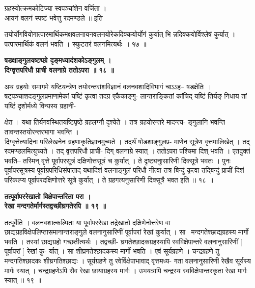 \documentclass[11pt, openany]{book}
\begin{document}
{{{{\vspace{2mm}
\centering
 ग्रहस्योत्क्रमकोटिज्या स्वपञ्चांशेन वर्जिता ।\\
 आयनं वलनं स्पष्टं भवेत्तु रदमण्डले ॥ इति
 
 \vspace{2mm}
 \justifying
 तयोर्योगवियोगात्पारमार्थिकमक्षवलनायनवलनयोरेकदिक्कयोर्योगं कुर्यात् भि
न्नदिक्कयोर्विश्लेषं कुर्यात् । पत्पारमार्थिकं वलनं भवति । स्फुटतरं
वलनमित्यर्थः ॥ १७ ॥

\vspace{2mm}
\centering
\textbf{
\hspace{-1.2cm}
 षडक्षाङ्गुलयष्ट्यग्रे दृङ्मध्यादंशकोऽङ्गुलम् ।\\
 दिग्वृत्तपरिधौ प्राची वलनाग्रे ततोऽपरा ॥ १८ ॥}

\vspace{2mm}
\justifying
 अथ ग्रहयोः समागमे यष्टियन्त्रेण तयोरन्तरांशविज्ञानं वलनवशादिविभागं
चाऽऽह-- षडक्षेति । षट्पञ्चाशदङ्गुलप्रमाणामेकां यष्टिं कृत्वा
तदग्र एकैकाङ्गु-
लान्तराङ्कितां कांचिद् यष्टिं तिर्यङ् निधाय तां यष्टिं दृशोर्मध्ये
विन्यस्य ग्रहानी-

\newpage
\thispagestyle{fancy}
\fancyhf{}
\rhead{[ग्रहणाधिकारः] }
\justifying
\noindent
क्षेत । यथा तिर्यगवस्थितयष्टिपृष्ठे ग्रहलग्नौ दृश्येते । तत्र
ग्रहयोरन्तरे मादन्त्य- 
ङ्गुलानि भवन्ति तावन्तस्तयोरन्तरभागा भवन्ति ।\\ 
\indent
 दिग्वृत्तेत्यादिना परिलेखनेन ग्रहणाकृतिज्ञानमुच्यते । तदर्थं
षोडशाङ्गुलप्र-
माणेन सूत्रेण वृत्तमालिखेत् । तद् रदमण्डलमित्युच्यते । तद्
वृत्तपरिधौ प्राची- 
दिग् वलनाग्रे स्यात् । ततोऽपरा पश्चिमा दिश् भवति । एतदुक्तं
भवति-- तस्मिन् 
वृत्ते पूर्वापरसूत्रं दक्षिणोत्तसूत्रं च कुर्यात् । ते
दृष्ट्यनुासारिणी दिक्सूत्रे भवतः । 
पुनः पूर्वापरसूत्रस्य पूर्वाग्रपरिधिसंपाताद् यथादिशं वलनाङ्गुलं परिधौ
नीत्वा 
तत्र बिन्दुं कृत्वा तद्बिन्दुं प्राचीं दिशं परिकल्प्य
पूर्वापरदक्षिणोत्तरे सूत्रे कुर्यात् । 
ते ग्रहगत्यनुसारिणी दिक्सूत्रै भवत इति ॥ १८ ॥

\vspace{2mm}
\centering
\textbf{
\hspace{-1cm}
 तत्पूर्वापररेखातो विक्षेपान्तरिता परा ।\\
 रेखा मन्दगतेर्मार्गस्तद्वच्छीघ्रगतेरपि ॥ १९ ॥ }

\vspace{3mm}
\justifying
 तत्पूर्वेति । वलनवशात्कल्पिता या पूर्वापररेखा तद्रेखातो
दक्षिणेनोत्तरेण वा 
छाद्यग्रहविक्षेपलिप्तासमानान्तराङ्गुले वलनानुसारिणीं पूर्वापरां रेखां
कुर्यात् । सा 
मन्दगतेश्छाद्यग्रहस्य मार्गो भवति । तस्यां छाद्यग्रहो गच्छतीत्यर्थः
। तद्वच्छी-
घ्रगतेश्छादकग्रहस्यापि स्वविक्षेपान्तरे वलनानुसारिणीं [ पूर्वापरां
] रेखां कु-
र्यात् । सा शीघ्रगतेश्छादकस्य मार्गो भवति । एवं सूर्यग्रहणे ।
चन्द्रग्रहणे तु 
मन्दगतिश्छादकः शीघ्रगतिश्छाद्यः । सूर्यग्रहणे तु रवेर्विक्षेपाभावाद्
वृत्तमध्य-
गता वलनानुसारिणी रेखैव सूर्यस्य मार्गः स्यात् । चन्द्रग्रहणेऽपि सैव
रेखा 
छायाग्रहस्य मार्गः । उभयत्रापि चन्द्रस्य स्वविक्षेपान्तरकृता रेखा
मार्गः स्यात् 
॥ १९ ॥

}}}}
\end{document}
